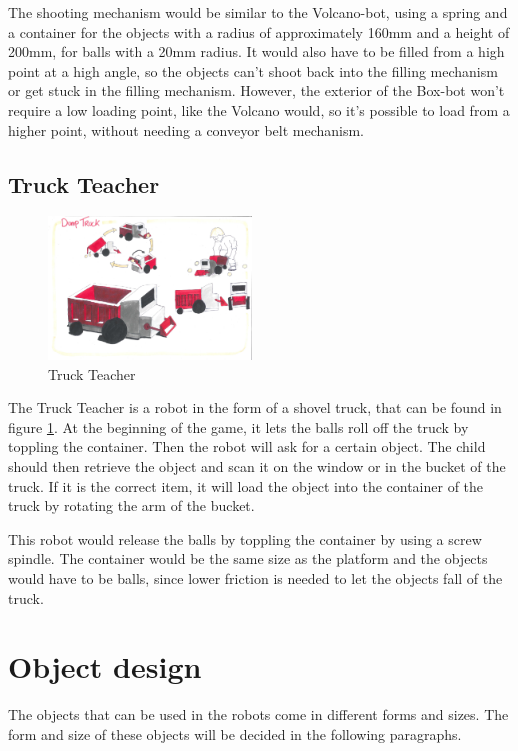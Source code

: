 \documentclass[11pt,twoside,a4paper]{report}
\begin{document}
The shooting mechanism would be similar to the Volcano-bot, using a spring and a container for the objects with a radius of approximately 160mm and a height of 200mm, for balls with a 20mm radius. It would also have to be filled from a high point at a high angle, so the objects can\rq{}t shoot back into the filling mechanism or get stuck in the filling mechanism. However, the exterior of the Box-bot won\rq{}t require a low loading point, like the Volcano would, so it\rq{}s possible to load from a higher point, without needing a conveyor belt mechanism.

\section{Truck Teacher}
\begin{figure}
  \begin{center}
    \includegraphics[width=0.48\textwidth]{Images/TruckTeacherConcept.pdf}
  \end{center}
  \caption{Truck Teacher}
  \label{figure:truckteacher}
\end{figure}
The Truck Teacher is a robot in the form of a shovel truck, that can be found in figure \ref{figure:truckteacher}. At the beginning of the game, it lets the balls roll off the truck by toppling the container. Then the robot will ask for a certain object. The child should then retrieve the object and scan it on the window or in the bucket of the truck. If it is the correct item, it will load the object into the container of the truck by rotating the arm of the bucket.

This robot would release the balls by toppling the container by using a screw spindle. The container would be the same size as the platform and the objects would have to be balls, since lower friction is needed to let the objects fall of the truck.

\chapter{Object design}
\label{chapter:objectdesign}
The objects that can be used in the robots come in different forms and sizes. The form and size of these objects will be decided in the following paragraphs. 
\end{document}
